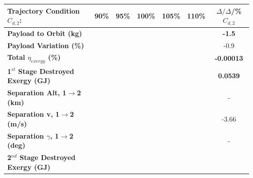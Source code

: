 \begin{table}[ht]
	\centering
	\begin{tabular}{l c c c c c c} 
		\hline \textbf{Trajectory Condition}   \qquad  $C_{d,2}$:
		&90\%
		&95\%
		&100\%
		&105\%
		&110\%
		& $\Delta/\Delta$/\%$C_{d,2}$
		\\
		\hline \textbf{Payload to Orbit (kg)}
		& \textbf{\PayloadToOrbitCdNinety}
		& \textbf{\PayloadToOrbitCdNinetyFive}
		& \textbf{\PayloadToOrbitCdStandard}
		& \textbf{\PayloadToOrbitCdOneHundredFive}
		& \textbf{\PayloadToOrbitCdOneHundredTen}
		&\textbf{-1.5}
		\\
		\textbf{Payload Variation (\%)}
		& \PayloadVarCdNinety
		& \PayloadVarCdNinetyFive
		& \PayloadVarCdStandard
		& \PayloadVarCdOneHundredFive
		& \PayloadVarCdOneHundredTen
		&-0.9
		\\
		\textbf{Total $\eta_{exergy}$ (\%)}
		& \textbf{\totalExergyEffCdNinety}
		& \textbf{\totalExergyEffCdNinetyFive}
		& \textbf{\totalExergyEffCdStandard}
		& \textbf{\totalExergyEffCdOneHundredFive}
		& \textbf{\totalExergyEffCdOneHundredTen}
		& \textbf{-0.00013}
		\\
		\hline 
		\textbf{1$^{st}$ Stage Destroyed Exergy (GJ)}
		& \textbf{\firstExergyDestroyedCdNinety}
		& \textbf{\firstExergyDestroyedCdNinetyFive}
		& \textbf{\firstExergyDestroyedCdStandard}
		& \textbf{\firstExergyDestroyedCdOneHundredFive}
		& \textbf{\firstExergyDestroyedCdOneHundredTen}
		& \textbf{0.0539}
		\\
		\textbf{Separation Alt, 1$\rightarrow$2 (km)}
		& \firstsecondSeparationAltCdNinety
		& \firstsecondSeparationAltCdNinetyFive
		& \firstsecondSeparationAltCdStandard
		& \firstsecondSeparationAltCdOneHundredFive
		& \firstsecondSeparationAltCdOneHundredTen
		& -
		\\
		\textbf{Separation v, 1$\rightarrow$2 (m/s)}
		& \firstsecondSeparationvCdNinety
		& \firstsecondSeparationvCdNinetyFive
		& \firstsecondSeparationvCdStandard
		& \firstsecondSeparationvCdOneHundredFive
		& \firstsecondSeparationvCdOneHundredTen
		&-3.66
		\\
		\textbf{Separation $\gamma$, 1$\rightarrow$2 (deg)}
		& \firstsecondSeparationgammaCdNinety
		& \firstsecondSeparationgammaCdNinetyFive
		& \firstsecondSeparationgammaCdStandard
		& \firstsecondSeparationgammaCdOneHundredFive
		& \firstsecondSeparationgammaCdOneHundredTen
		& -
		\\
		\hline 
		\textbf{2$^{nd}$ Stage Destroyed Exergy (GJ)}
		& \textbf{\secondExergyDestroyedCdNinety}
		& \textbf{\secondExergyDestroyedCdNinetyFive}

\end{tabular}
\end{table}

